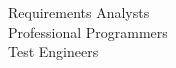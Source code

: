\documentclass[preview]{standalone}
\begin{document}
Requirements Analysts\\Professional Programmers\\Test Engineers\\
\end{document}
